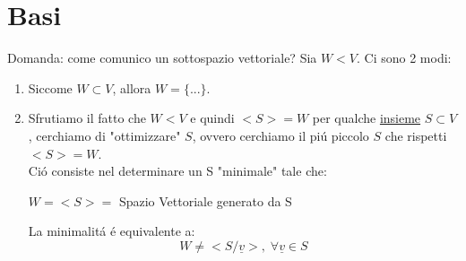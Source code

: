 
\section{Basi}
Domanda: come comunico un sottospazio vettoriale?
Sia $W<V$. Ci sono 2 modi:
\begin{enumerate}
    \item Siccome $W\subset V$, allora $W=\{...\}$.
    \item Sfrutiamo il fatto che $W<V$ e quindi $<S>=W$ per qualche \underline{insieme} $S\subset V$,
    cerchiamo di "ottimizzare" $S$, ovvero cerchiamo il piú piccolo $S$ che rispetti $<S>=W$.
    \\Ció consiste nel determinare un S "minimale" tale che:
    \begin{center}
        $W = <S> =$ Spazio Vettoriale generato da S
    \end{center}
    La minimalitá é equivalente a:
    \[ W\neq <S/\underline{v}>, \; \forall \underline{v} \in S \]
\end{enumerate}

